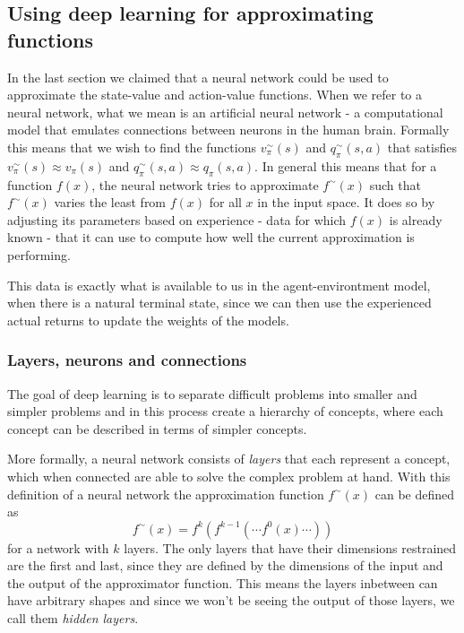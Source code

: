 \documentclass[11pt]{article}
\begin{document}
\maketitle

\subsection{Using deep learning for approximating functions}

In the last section we claimed that a neural network could be used to approximate the
state-value and action-value functions.
When we refer to a neural network, what we mean is an artificial neural network -
a computational model that emulates connections between neurons in the human brain.
Formally this means that we wish to find the functions $v_\pi^{\sim}(s)$ and $q_\pi^{\sim}(s,a)$ that
satisfies $v_\pi^{\sim}(s) \approx v_\pi(s)$ and $q_\pi^{\sim}(s,a) \approx q_\pi(s, a)$.
In general this means that for a function $f(x)$, the neural network tries to approximate
$f^{\sim}(x)$ such that $f^{\sim}(x)$ varies the least from $f(x)$ for all $x$ in the input
space\cite{DeepLearningBook}.
It does so by adjusting its parameters based on experience - data for which $f(x)$ is already known -
that it can use to compute how well the current approximation is performing.

This data is exactly what is available to us in the agent-environtment model, when there is a natural terminal state,
since we can then use the experienced actual returns to update the weights of the models.

\subsubsection{Layers, neurons and connections}

The goal of deep learning is to separate difficult problems into smaller and simpler problems
and in this process create a hierarchy of concepts, where each concept can be described in terms
of simpler concepts\cite{DeepLearningBook}.

More formally, a neural network consists of \textit{layers} that each represent a concept, which
when connected are able to solve the complex problem at hand.
With this definition of a neural network the approximation function $f^{\sim}(x)$ can be
defined as
\begin{equation}
    f^{\sim}(x) = f^{k}(f^{k-1}( \cdots f^{0}(x) \cdots))
\end{equation}
for a network with $k$ layers.
The only layers that have their dimensions restrained are the first and last, since they are defined by the
dimensions of the input and the output of the approximator function.
This means the layers inbetween can have arbitrary shapes and
since we won't be seeing the output of those layers, we call them \textit{hidden layers}.
\end{document}

